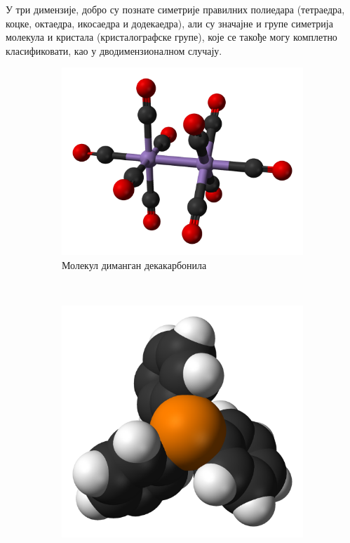 \documentclass{report}
\theoremstyle{plain}
\theoremstyle{definition}
\begin{document}
У три димензије, добро су познате симетрије правилних полиедара (тетраедра, коцке, октаедра, икосаедра и додекаедра), али су значајне и групе симетрија молекула и кристала (кристалографске групе), које се такође могу комплетно класификовати, као у дводимензионалном случају.

\begin{figure}[h]
\centering
\begin{subfigure}{0.3\textwidth}
\includegraphics[width=\textwidth]{molekul3}
\caption{Молекул диманган декакарбонила}
\end{subfigure}
~
\begin{subfigure}{0.3\textwidth}
\includegraphics[width=\textwidth]{molekul1}

\end{subfigure}
\end{figure}
\end{document}
